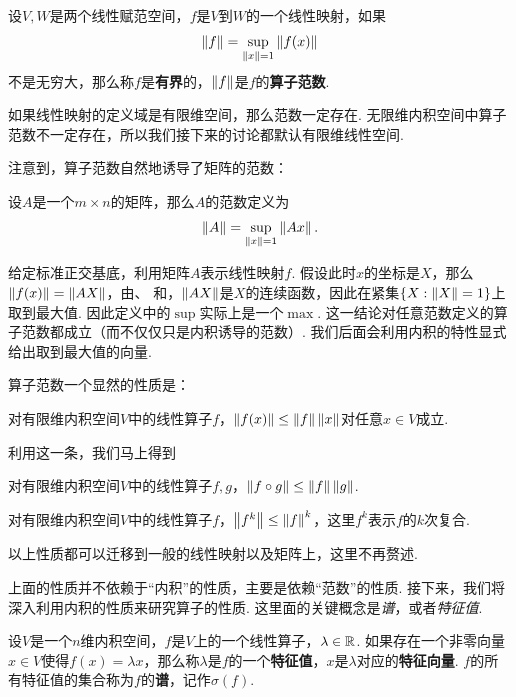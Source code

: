 \begin{definition}[线性映射的范数]
    设$V,W$是两个线性赋范空间，$f$是$V$到$W$的一个线性映射，如果
    \[\left\|f\right\|=\sup_{\left\|x\right\|=1}\left\|f(x)\right\|\]
    不是无穷大，那么称$f$是\textbf{有界}的，$\left\|f\right\|$是$f$的\textbf{算子范数}. 
\end{definition}

如果线性映射的定义域是有限维空间，那么范数一定存在. 无限维内积空间中算子范数不一定存在，所以我们接下来的讨论都默认有限维线性空间. 

注意到，算子范数自然地诱导了矩阵的范数：
\begin{definition}[矩阵范数]
    设$A$是一个$m\times n$的矩阵，那么$A$的范数定义为
    \[\left\|A\right\|=\sup_{\left\|x\right\|=1}\left\|Ax\right\|.\]
\end{definition}

给定标准正交基底，利用矩阵$A$表示线性映射$f$. 假设此时$x$的坐标是$X$，那么$\left\|f(x)\right\|=\left\|AX\right\|$，由、 和，$\left\|AX\right\|$是$X$的连续函数，因此在紧集$\{X:\left\|X\right\|=1\}$上取到最大值. 因此定义中的$\sup$实际上是一个$\max$. 这一结论对任意范数定义的算子范数都成立（而不仅仅只是内积诱导的范数）. 我们后面会利用内积的特性显式给出取到最大值的向量. 

算子范数一个显然的性质是：

\begin{proposition}\label{prop:norm-ineq}
对有限维内积空间$V$中的线性算子$f$，$\left\|f(x)\right\|\leq \left\|f\right\|\left\|x\right\|$对任意$x\in V$成立. 
\end{proposition}

利用这一条，我们马上得到

\begin{proposition}\label{prop:operator-norm-ineq}
对有限维内积空间$V$中的线性算子$f,g$，$\left\|f\circ g\right\|\leq \left\|f\right\|\left\|g\right\|$.
\end{proposition}

\begin{proposition}\label{prop:operator-power-norm-ineq}
    对有限维内积空间$V$中的线性算子$f$，$\left\|f^k\right\|\leq \left\|f\right\|^k$，这里$f^k$表示$f$的$k$次复合. 
\end{proposition}

以上性质都可以迁移到一般的线性映射以及矩阵上，这里不再赘述. 

上面的性质并不依赖于“内积”的性质，主要是依赖“范数”的性质. 接下来，我们将深入利用内积的性质来研究算子的性质. 这里面的关键概念是\textit{谱}，或者\textit{特征值}. 

\begin{definition}
设$V$是一个$n$维内积空间，$f$是$V$上的一个线性算子，$\lambda\in\mathbb{R}$. 如果存在一个非零向量$x\in V$使得$f(x)=\lambda x$，那么称$\lambda$是$f$的一个\textbf{特征值}，$x$是$\lambda$对应的\textbf{特征向量}. $f$的所有特征值的集合称为$f$的\textbf{谱}，记作$\sigma(f)$. 
\end{definition}


